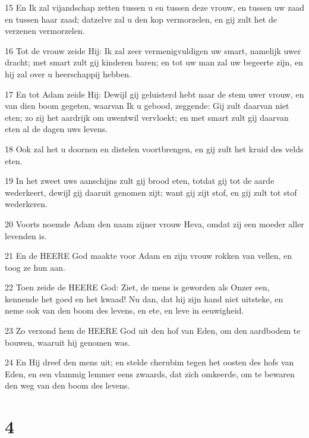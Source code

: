 \par 15 En Ik zal vijandschap zetten tussen u en tussen deze vrouw, en tussen uw zaad en tussen haar zaad; datzelve zal u den kop vermorzelen, en gij zult het de verzenen vermorzelen.
\par 16 Tot de vrouw zeide Hij: Ik zal zeer vermenigvuldigen uw smart, namelijk uwer dracht; met smart zult gij kinderen baren; en tot uw man zal uw begeerte zijn, en hij zal over u heerschappij hebben.
\par 17 En tot Adam zeide Hij: Dewijl gij geluisterd hebt naar de stem uwer vrouw, en van dien boom gegeten, waarvan Ik u gebood, zeggende: Gij zult daarvan niet eten; zo zij het aardrijk om uwentwil vervloekt; en met smart zult gij daarvan eten al de dagen uws levens.
\par 18 Ook zal het u doornen en distelen voortbrengen, en gij zult het kruid des velds eten.
\par 19 In het zweet uws aanschijns zult gij brood eten, totdat gij tot de aarde wederkeert, dewijl gij daaruit genomen zijt; want gij zijt stof, en gij zult tot stof wederkeren.
\par 20 Voorts noemde Adam den naam zijner vrouw Heva, omdat zij een moeder aller levenden is.
\par 21 En de HEERE God maakte voor Adam en zijn vrouw rokken van vellen, en toog ze hun aan.
\par 22 Toen zeide de HEERE God: Ziet, de mens is geworden als Onzer een, kennende het goed en het kwaad! Nu dan, dat hij zijn hand niet uitsteke, en neme ook van den boom des levens, en ete, en leve in eeuwigheid.
\par 23 Zo verzond hem de HEERE God uit den hof van Eden, om den aardbodem te bouwen, waaruit hij genomen was.
\par 24 En Hij dreef den mens uit; en stelde cherubim tegen het oosten des hofs van Eden, en een vlammig lemmer eens zwaards, dat zich omkeerde, om te bewaren den weg van den boom des levens.

\chapter{4}

